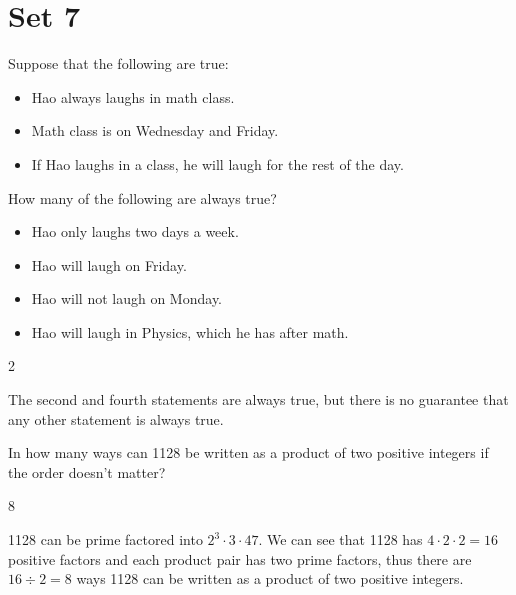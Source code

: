 \documentclass[11pt]{article}
\begin{document}
\newpage

\section*{Set 7}

\begin{problem}%
Suppose that the following are true:
\begin{itemize}
	\item Hao always laughs in math class.
	\item Math class is on Wednesday and Friday.
	\item If Hao laughs in a class, he will laugh for the rest of the day.
\end{itemize}
How many of the following are always true?
\begin{itemize}
	\item Hao only laughs two days a week.
	\item Hao will laugh on Friday.
	\item Hao will not laugh on Monday.
	\item Hao will laugh in Physics, which he has after math.
\end{itemize}
\end{problem}

\begin{answer}
2
\end{answer}

\begin{solution}
The second and fourth statements are always true, but there is no guarantee that any other statement is always true.
\end{solution}


\begin{problem} %
In how many ways can 1128 be written as a product of two positive integers if the order doesn't matter?
\end{problem}

\begin{answer}
8
\end{answer}

\begin{solution}
1128 can be prime factored into $2^3 \cdot 3 \cdot 47$. We can see that 1128 has $4 \cdot 2 \cdot 2 = 16$ positive factors and each product pair has two prime factors, thus there are $16 \div 2 = 8$ ways 1128 can be written as a product of two positive integers.   
\end{solution}
\end{document}
